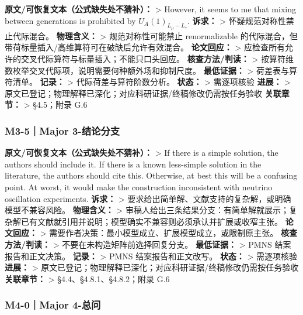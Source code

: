 \documentclass[
]{article}
\begin{document}
\textbf{原文/可恢复文本（公式缺失处不猜补）：} \textgreater{} However,
it seems to me that mixing between generations is prohibited by
\(U_A(1)_{L_{\mu}-L_{\tau}}\). \textbf{诉求：} \textgreater{}
怀疑规范对称性禁止代际混合。 \textbf{物理含义：} \textgreater{}
规范对称性可能禁止 renormalizable
的代际混合，但带荷标量插入/高维算符可在破缺后允许有效混合。
\textbf{论文回应：} \textgreater{}
应检查所有允许的交叉代际算符与标量插入；不能只口头回应。
\textbf{核查方法/判读：} \textgreater{}
按算符维数枚举交叉代际项，说明需要何种额外场和抑制尺度。
\textbf{最低证据：} \textgreater{} 荷差表与算符清单。 \textbf{记录：}
\textgreater{} 代际荷差与算符阶数分析。 \textbf{状态：} \textgreater{}
需逐项核验 \textbf{进展：} \textgreater{}
原文已登记；物理解释已深化；对应科研证据/终稿修改仍需按任务验收
\textbf{关联章节：} \textgreater{} §4.5；附录 G.6

\subsubsection{M3-5｜Major
3-结论分支}\label{m3-5major-3-ux7ed3ux8bbaux5206ux652f}

\textbf{原文/可恢复文本（公式缺失处不猜补）：} \textgreater{} If there
is a simple solution, the authors should include it. If there is a known
less-simple solution in the literature, the authors should cite this.
Otherwise, at best this will be a confusing point. At worst, it would
make the construction inconsistent with neutrino oscillation
experiments. \textbf{诉求：} \textgreater{}
要求给出简单解、文献支持的复杂解，或明确模型不兼容风险。
\textbf{物理含义：} \textgreater{}
审稿人给出三条结果分支：有简单解就展示；复杂解已有文献就引用并说明；模型确实不兼容则必须承认并扩展或收窄主张。
\textbf{论文回应：} \textgreater{}
需要作者决策：最小模型成立、扩展模型成立，或限制原主张。
\textbf{核查方法/判读：} \textgreater{} 不要在未构造矩阵前选择回复分支。
\textbf{最低证据：} \textgreater{} PMNS 结案报告和正文决策。
\textbf{记录：} \textgreater{} PMNS 结案报告和正文改写。 \textbf{状态：}
\textgreater{} 需逐项核验 \textbf{进展：} \textgreater{}
原文已登记；物理解释已深化；对应科研证据/终稿修改仍需按任务验收
\textbf{关联章节：} \textgreater{} §4.4、§4.8.1、§4.8.2；附录 G.6

\subsubsection{M4-0｜Major 4-总问}\label{m4-0major-4-ux603bux95ee}
\end{document}
